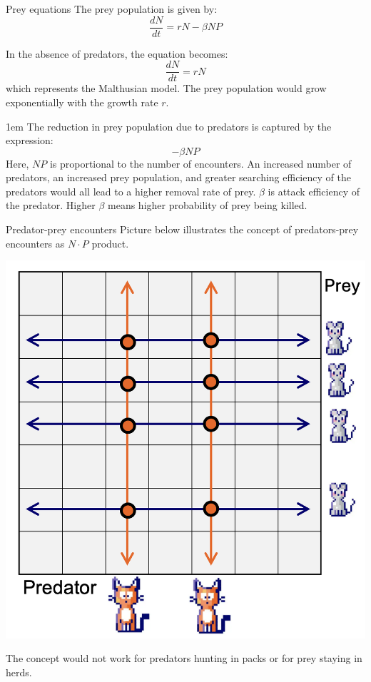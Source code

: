 \begin{frame}{Prey equations}
\footnotesize
    The prey population is given by:
    \begin{equation}
        \frac{dN}{dt} = rN - \beta NP
    \end{equation}
    
    \pause
    In the absence of predators, the equation becomes:
    \begin{equation}
        \frac{dN}{dt} = rN 
    \end{equation}
    which represents the Malthusian model. The prey population would grow exponentially with the growth rate $r$.

    \pause
 \vfill{1em}
    The reduction in prey population due to predators is captured by the expression:
    \begin{equation}
        - \beta NP
    \end{equation}
    \pause
    Here, $NP$ is proportional to the number of encounters. An increased number of predators, an increased prey population, and greater searching efficiency of the predators would all lead to a higher removal rate of prey.
    $\beta$ is attack efficiency of the predator. Higher $\beta$ means higher probability of prey being killed.
\end{frame}


\begin{frame}{Predator-prey encounters}
Picture below illustrates the concept of predators-prey encounters as $N \cdot P$ product.
\vfill
\begin{center}
     \includegraphics[scale = 0.22]{lesson_2/images/predator_meetings.png}
\end{center}
\pause
The concept would not work for predators hunting in packs or for  prey staying in herds. 
\end{frame}

